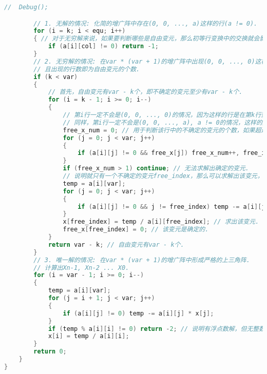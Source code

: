 \begin{lstlisting}[language=C++]
      //  Debug();

        // 1. 无解的情况: 化简的增广阵中存在(0, 0, ..., a)这样的行(a != 0).
        for (i = k; i < equ; i++)
        { // 对于无穷解来说，如果要判断哪些是自由变元，那么初等行变换中的交换就会影响，则要记录交换.
            if (a[i][col] != 0) return -1;
        }
        // 2. 无穷解的情况: 在var * (var + 1)的增广阵中出现(0, 0, ..., 0)这样的行，即说明没有形成严格的上三角阵.
        // 且出现的行数即为自由变元的个数.
        if (k < var)
        {
            // 首先，自由变元有var - k个，即不确定的变元至少有var - k个.
            for (i = k - 1; i >= 0; i--)
            {
                // 第i行一定不会是(0, 0, ..., 0)的情况，因为这样的行是在第k行到第equ行.
                // 同样，第i行一定不会是(0, 0, ..., a), a != 0的情况，这样的无解的.
                free_x_num = 0; // 用于判断该行中的不确定的变元的个数，如果超过1个，则无法求解，它们仍然为不确定的变元.
                for (j = 0; j < var; j++)
                {
                    if (a[i][j] != 0 && free_x[j]) free_x_num++, free_index = j;
                }
                if (free_x_num > 1) continue; // 无法求解出确定的变元.
                // 说明就只有一个不确定的变元free_index，那么可以求解出该变元，且该变元是确定的.
                temp = a[i][var];
                for (j = 0; j < var; j++)
                {
                    if (a[i][j] != 0 && j != free_index) temp -= a[i][j] * x[j];
                }
                x[free_index] = temp / a[i][free_index]; // 求出该变元.
                free_x[free_index] = 0; // 该变元是确定的.
            }
            return var - k; // 自由变元有var - k个.
        }
        // 3. 唯一解的情况: 在var * (var + 1)的增广阵中形成严格的上三角阵.
        // 计算出Xn-1, Xn-2 ... X0.
        for (i = var - 1; i >= 0; i--)
        {
            temp = a[i][var];
            for (j = i + 1; j < var; j++)
            {
                if (a[i][j] != 0) temp -= a[i][j] * x[j];
            }
            if (temp % a[i][i] != 0) return -2; // 说明有浮点数解，但无整数解.
            x[i] = temp / a[i][i];
        }
        return 0;
    }
}
\end{lstlisting}
